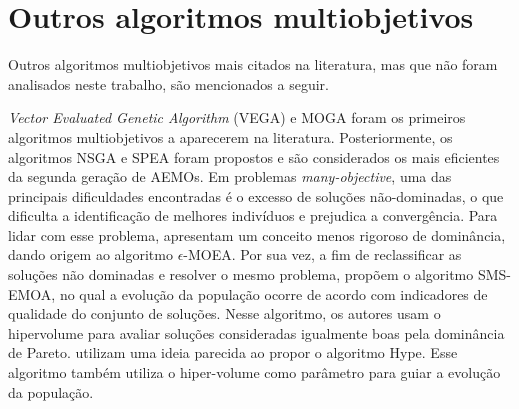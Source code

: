 \section{Outros algoritmos multiobjetivos}
Outros algoritmos multiobjetivos mais citados na literatura, mas que não foram analisados neste trabalho, são mencionados a seguir.

\textit{Vector Evaluated Genetic Algorithm} (VEGA) \cite{Schaffer1985} e \ac{MOGA} \cite{MOGA} foram os primeiros algoritmos multiobjetivos a aparecerem na literatura. Posteriormente, os algoritmos \ac{NSGA} \cite{Srinivas1994} e \ac{SPEA} \cite{Zitzler1999} foram propostos e são considerados os mais eficientes da segunda geração de \acp{AEMO}. Em problemas \textit{many-objective}, uma das principais dificuldades encontradas é o excesso de soluções não-dominadas, o que dificulta a identificação de melhores indivíduos e prejudica a convergência. Para lidar com esse problema, \cite{Aguirre2009} apresentam um conceito menos rigoroso de dominância, dando origem ao algoritmo $\epsilon$-MOEA. Por sua vez, a fim de reclassificar as soluções não dominadas e resolver o mesmo problema, \cite{Beume2007} propõem o algoritmo SMS-EMOA, no qual a evolução da população ocorre de acordo com indicadores de qualidade do conjunto de soluções. Nesse algoritmo, os autores usam o hipervolume para avaliar soluções consideradas igualmente boas pela dominância de Pareto. \cite{Bader2011} utilizam uma ideia parecida ao propor o algoritmo Hype. Esse algoritmo também utiliza o hiper-volume como parâmetro para guiar a evolução da população. 

